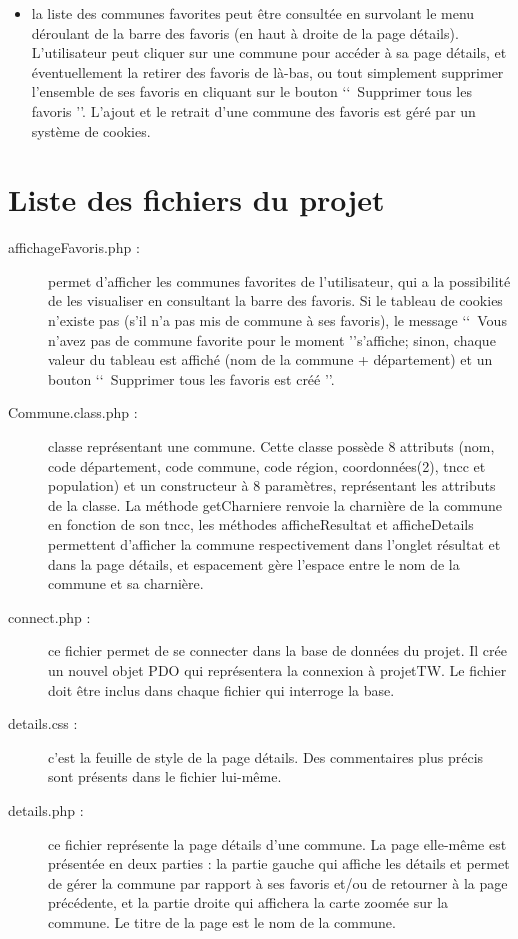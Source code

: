 \documentclass{report}
\begin{document}
\begin{itemize}
\item la liste des communes favorites peut être consultée en survolant le menu déroulant de la barre des favoris (en haut à droite de la page détails). L'utilisateur peut cliquer sur une commune pour accéder à sa page détails, et éventuellement la retirer des favoris de là-bas, ou tout simplement supprimer l'ensemble de ses favoris en cliquant sur le bouton \lq\lq\ Supprimer tous les favoris \rq\rq. L'ajout et le retrait d'une commune des favoris est géré par un système de cookies.
\end{itemize}
\section*{Liste des fichiers du projet}
\begin{description}
\item[affichageFavoris.php :] permet d'afficher les communes favorites de l'utilisateur, qui a la possibilité de les visualiser en consultant la barre des favoris. Si le tableau de cookies n'existe pas (s'il n'a pas mis de commune à ses favoris), le message \lq\lq\ Vous n'avez pas de commune favorite pour le moment \rq\rq s'affiche; sinon, chaque valeur du tableau est affiché (nom de la commune + département) et un bouton \lq\lq\ Supprimer tous les favoris est créé \rq\rq.
\item[Commune.class.php :] classe représentant une commune. Cette classe possède 8 attributs (nom, code département, code commune, code région, coordonnées(2), tncc et population) et un constructeur à 8 paramètres, représentant les attributs de la classe. La méthode getCharniere renvoie la charnière de la commune en fonction de son tncc, les méthodes afficheResultat et afficheDetails permettent d'afficher la commune respectivement dans l'onglet résultat et dans la page détails, et espacement gère l'espace entre le nom de la commune et sa charnière.
\item[connect.php :] ce fichier permet de se connecter dans la base de données du projet. Il crée un nouvel objet PDO qui représentera la connexion à projetTW. Le fichier doit être inclus dans chaque fichier qui interroge la base.
\item[details.css :] c'est la feuille de style de la page détails. Des commentaires plus précis sont présents dans le fichier lui-même.
\item[details.php :] ce fichier représente la page détails d'une commune. La page elle-même est présentée en deux parties : la partie gauche qui affiche les détails et permet de gérer la commune par rapport à ses favoris et/ou de retourner à la page précédente, et la partie droite qui affichera la carte zoomée sur la commune. Le titre de la page est le nom de la commune.

\end{description}
\end{document}

